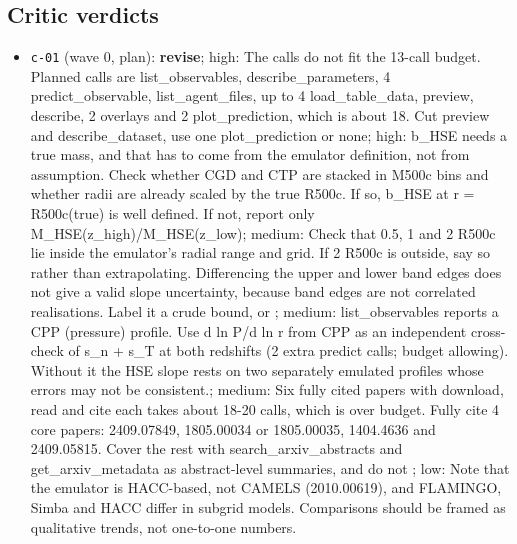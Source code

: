 \documentclass[11pt,a4paper]{article}
\begin{document}
\subsection{Critic verdicts}
\begin{itemize}
  \item \texttt{c-01} (wave 0, plan): \textbf{revise}; high: The calls do not fit the 13-call budget. Planned calls are list\_observables, describe\_parameters, 4 predict\_observable, list\_agent\_files, up to 4 load\_table\_data, preview, describe, 2 overlays and 2 plot\_prediction, which is about 18. Cut preview and describe\_dataset, use one plot\_prediction or none; high: b\_HSE needs a true mass, and that has to come from the emulator definition, not from assumption. Check whether CGD and CTP are stacked in M500c bins and whether radii are already scaled by the true R500c. If so, b\_HSE at r = R500c(true) is well defined. If not, report only M\_HSE(z\_high)/M\_HSE(z\_low); medium: Check that 0.5, 1 and 2 R500c lie inside the emulator's radial range and grid. If 2 R500c is outside, say so rather than extrapolating. Differencing the upper and lower band edges does not give a valid slope uncertainty, because band edges are not correlated realisations. Label it a crude bound, or ; medium: list\_observables reports a CPP (pressure) profile. Use d ln P/d ln r from CPP as an independent cross-check of s\_n + s\_T at both redshifts (2 extra predict calls; budget allowing). Without it the HSE slope rests on two separately emulated profiles whose errors may not be consistent.; medium: Six fully cited papers with download, read and cite each takes about 18-20 calls, which is over budget. Fully cite 4 core papers: 2409.07849, 1805.00034 or 1805.00035, 1404.4636 and 2409.05815. Cover the rest with search\_arxiv\_abstracts and get\_arxiv\_metadata as abstract-level summaries, and do not ; low: Note that the emulator is HACC-based, not CAMELS (2010.00619), and FLAMINGO, Simba and HACC differ in subgrid models. Comparisons should be framed as qualitative trends, not one-to-one numbers.

\end{itemize}
\end{document}
